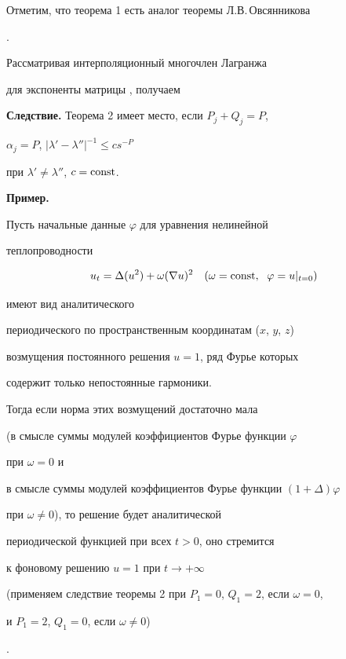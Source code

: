 Отметим, что теорема 1 есть аналог теоремы Л.В.\,Овсянникова


\cite{Ovsyannikov}.


Рассматривая интерполяционный многочлен Лагранжа \cite{Gantm}


для экспоненты матрицы \cite{Titov1}, получаем


\medskip





{\bf Следствие.} Теорема 2 имеет место, если $P_j+Q_j=P$,


$\alpha_j=P$, $|\lambda'-\lambda''|^{-1}\leq c s^{-P}$


при $\lambda'\neq\lambda''$, $c=\operatorname{const}$.


\medskip





{\bf Пример.}


Пусть начальные данные $\varphi$ для уравнения нелинейной


теплопроводности


$$


u_t=\Delta(u^2)+\omega(\nabla u)^2 \quad


(\omega=\const,\ \; \varphi=u|_{t=0})


$$


имеют вид аналитического


периодического по пространственным координатам ($x$, $y$, $z$)


возмущения постоянного решения $u=1$, ряд Фурье которых


содержит только непостоянные гармоники.


Тогда если норма этих возмущений достаточно мала


(в смысле суммы модулей коэффициентов Фурье функции $\varphi$


при $\omega=0$ и


в смысле суммы модулей коэффициентов Фурье функции $(1+\Delta)\varphi$


при $\omega\neq0$), то решение будет аналитической


периодической функцией при всех $t>0$, оно стремится


к фоновому решению $u=1$ при $t\rightarrow+\infty$


(применяем следствие теоремы 2 при $P_1=0$, $Q_1=2$, если $\omega=0$,


и $P_1=2$, $Q_1=0$, если $\omega\neq0$)


\cite{TitovArzamas}.


